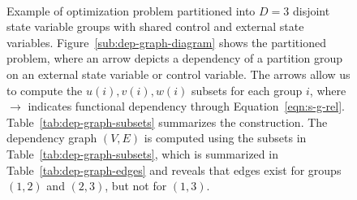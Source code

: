 \begin{figure}[t]
\centering
   \hfill
  \\
    \caption{Example of optimization problem partitioned into $D=3$ disjoint state variable groups with shared control and external state variables. Figure~\ref{sub:dep-graph-diagram} shows the partitioned problem, where an arrow depicts a dependency of a partition group on an external state variable or control variable. The arrows allow us to compute the $u\left(i\right), v\left(i\right), w\left(i\right)$ subsets for each group $i$, where $\rightarrow$ indicates functional dependency through Equation~\ref{eqn:s-g-rel}. Table~\ref{tab:dep-graph-subsets} summarizes the construction. The dependency graph $(V,E)$ is computed using the subsets in Table~\ref{tab:dep-graph-subsets}, which is summarized in Table~\ref{tab:dep-graph-edges} and reveals that edges exist for groups $\left(1,2\right)$ and $\left(2,3\right)$, but not for $\left(1,3\right)$.}
    \label{fig:dep-graph}
  \end{figure}


